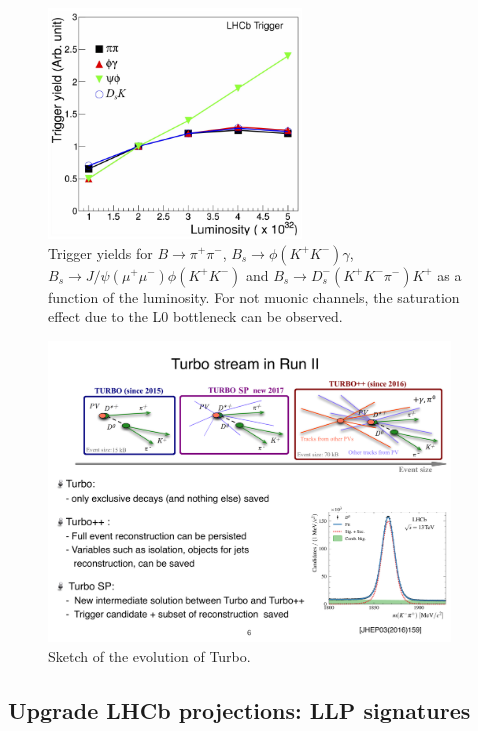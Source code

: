 \begin{figure}[h]
\centerline{\includegraphics[width=0.6\textwidth]{figures/L0vsLumi.pdf}}
\caption{Trigger yields for ${B\to\pi^+\pi^-}$, ${B_s\to\phi(K^+K^-)\gamma}$, ${B_s\to J/\psi(\mu^+\mu^-)\phi(K^+K^-)}$ and ${B_s\to D_s^-(K^+K^-\pi^-)K^+}$ as a function of the luminosity. For not muonic channels, the saturation effect due to the L0 bottleneck can be observed.}
  \label{fig:triggervsLumi}
\end{figure}

\begin{figure}[h]
\centerline{\includegraphics[width=0.95\textwidth]{figures/Turbo.pdf}}
  \caption{Sketch of the evolution of Turbo.}
  \label{fig:turbo}
\end{figure}




\subsection{Upgrade LHCb projections: LLP signatures}
\label{sec:ulhcbphys}

